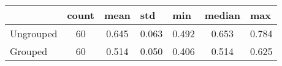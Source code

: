 \begin{tabular}{lcccccc}
	\hline\hline
	& \multicolumn{1}{l}{count} & \multicolumn{1}{l}{mean} &
	
	\multicolumn{1}{l}{std} & \multicolumn{1}{l}{min} &
	\multicolumn{1}{l}{median} & \multicolumn{1}{l}{max} \\
	\midrule
	Ungrouped & 60    & 0.645 & 0.063 & 0.492 & 0.653 & 0.784 \\
	\addlinespace
	Grouped & 60    & 0.514 & 0.050 & 0.406 & 0.514 & 0.625 \\
	\hline\hline
\end{tabular}%